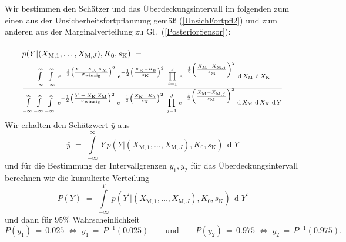 Wir bestimmen den Schätzer und das Überdeckungsintervall im folgenden zum einen aus der
Unsicherheitsfortpflanzung gemäß (\ref{UnsichFortpfl2})
und zum anderen aus der Marginalverteilung zu Gl.~(\ref{PosteriorSensor}):
\begin{equation}
\arraycolsep=2.0pt\def\arraystretch{2.0}
\begin{array}{l}
p(Y | (X_{\mathrm{M},1}, \dots, X_{\mathrm{M},J}), K_0, s_\mathrm{K}) \; = \;\\
\frac{\int\limits_{-\infty}^\infty \int\limits_{-\infty}^\infty \,
e^{-\frac{1}{2} \left(\frac{ Y \; - \; X_\mathrm{K} \, X_\mathrm{M}}{\sigma_\mathrm{winzig}} \right)^2}
\;  e^{-\frac{1}{2} \left(\frac{X_\mathrm{K} - K_0}{s_\mathrm{K}} \right)^2} \; \prod\limits_{j=1}^J \,
 e^{-\frac{1}{2} \left(\frac{ X_\mathrm{M} - X_{\mathrm{M},j} }{s_\mathrm{M}} \right)^2} \,
\operatorname{d}X_\mathrm{M} \, \operatorname{d}X_\mathrm{K} }
{\int\limits_{-\infty}^\infty  \int\limits_{-\infty}^\infty \int\limits_{-\infty}^\infty \,
e^{-\frac{1}{2} \left(\frac{ Y \; - \; X_\mathrm{K} \, X_\mathrm{M}}{\sigma_\mathrm{winzig}} \right)^2}
\; e^{-\frac{1}{2} \left(\frac{X_\mathrm{K} - K_0}{s_\mathrm{K}} \right)^2} \;\prod\limits_{j=1}^J \,
 e^{-\frac{1}{2} \left(\frac{ X_\mathrm{M} - X_{\mathrm{M},j} }{s_\mathrm{M}} \right)^2} \,
\operatorname{d}X_\mathrm{M} \, \operatorname{d}X_\mathrm{K} \, \operatorname{d}Y}
\end{array}
\label{marginalPosteriorFall2}
\end{equation}
Wir erhalten den Schätzwert $\bar y$ aus
\begin{equation}
\bar y \; = \; \int\limits_{-\infty}^\infty \, Y \, 
p(Y | (X_{\mathrm{M},1}, \dots, X_{\mathrm{M},J}), K_0, s_\mathrm{K}) \, \operatorname{d}Y
\label{ErwartungswertY}
\end{equation}
und für die Bestimmung der Intervallgrenzen $y_1, y_2$ für das Überdeckungsintervall
berechnen wir die kumulierte Verteilung
\begin{equation}
P(Y) \; = \;  \int\limits_{-\infty}^Y \, 
p(Y^\prime | (X_{\mathrm{M},1}, \dots, X_{\mathrm{M},J}), K_0, s_\mathrm{K}) \, \operatorname{d}Y^\prime
\label{cdfBeispiel}
\end{equation}
und dann für $95 \%$ Wahrscheinlichkeit
\begin{equation}
P(y_1) \, = \, 0.025 \; \Leftrightarrow \; y_1 \, = \, P^{-1}(0.025) 
\qquad \mathrm{und} \qquad P(y_2) \, = \, 0.975 \;
\Leftrightarrow \;  y_2 \, = \, P^{-1}(0.975) .
\end{equation}


